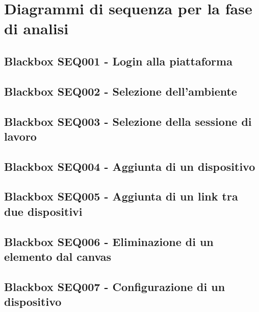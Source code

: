 \documentclass[../main.tex]{subfiles}
\begin{document}
\section{Diagrammi di sequenza per la fase di analisi}

\subsection{Blackbox SEQ001 - Login alla piattaforma }
\figure[H]
\centering

\endfigure
\vfill\newpage

\subsection{Blackbox SEQ002 - Selezione dell'ambiente }
\figure[H]
\centering

\endfigure
\vfill\newpage

\subsection{Blackbox SEQ003 - Selezione della sessione di lavoro }
\figure[H]
\centering

\endfigure
\vfill\newpage
\subsection{Blackbox SEQ004 - Aggiunta di un dispositivo }
\figure[H]
\centering

\endfigure
\vfill\newpage
\subsection{Blackbox SEQ005 - Aggiunta di un link tra due dispositivi }
\figure[H]
\centering

\endfigure
\vfill\newpage
\subsection{Blackbox SEQ006 - Eliminazione di un elemento dal canvas }
\figure[H]
\centering

\endfigure
\vfill\newpage
\subsection{Blackbox SEQ007 - Configurazione di un dispositivo }
\figure[H]
\centering

\endfigure
\vfill\newpage
\end{document}
